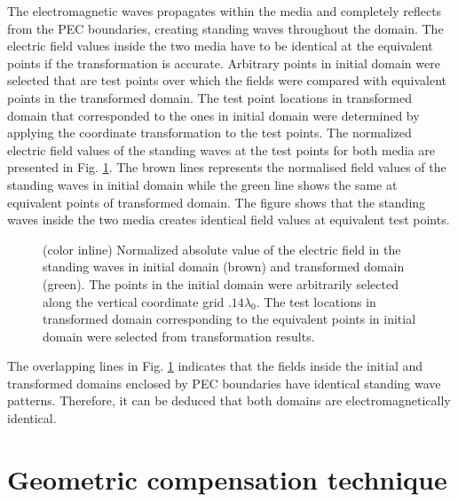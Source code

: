 %

The electromagnetic waves propagates within the media and completely reflects from the PEC boundaries, creating standing waves throughout the domain. The electric field values inside the two media have to be identical at the equivalent points if the transformation is accurate. Arbitrary points in initial domain were selected that are test points over which the fields were compared with equivalent points in the transformed domain. The test point locations in transformed domain that corresponded to the ones in initial domain were determined by applying the coordinate transformation to the test points. The normalized electric field values of the standing waves at the test points for both media are presented in Fig. \ref{fig:TOvalidplot}. The brown lines represents the normalised field values of the standing waves in initial domain while the green line shows the same at equivalent points of transformed domain. The figure shows that the standing waves inside the two media creates identical field values at equivalent test points. 

\begin{figure} [t!]
  \begin{center}
 
 \end{center}
  \caption[Normalized absolute value of the electric field in the standing waves in initial domain and transformed domain confirming the numerical transformation process.]{(color inline) Normalized absolute value of the electric field in the standing waves in initial domain (brown) and transformed domain (green). The points in the initial domain were arbitrarily selected along the vertical coordinate grid $.14 \lambda_0 $. The test locations in transformed domain corresponding to the equivalent points in initial domain were selected from transformation results.}
\label{fig:TOvalidplot}
\end{figure}

The overlapping lines in Fig. \ref{fig:TOvalidplot} indicates that the fields inside the initial and transformed domains enclosed by PEC boundaries have identical standing wave patterns. Therefore, it can be deduced that both domains are electromagnetically identical.

\section{Geometric compensation technique}

